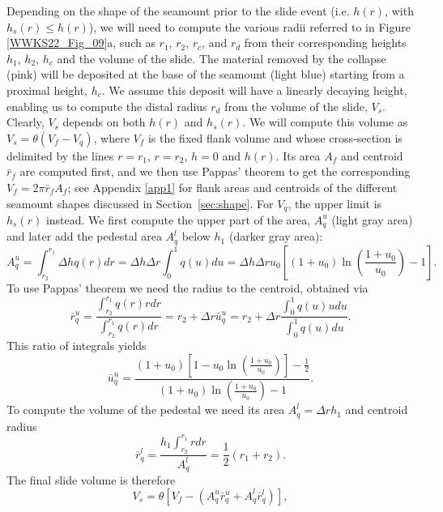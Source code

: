 Depending on the shape of the seamount prior to the slide event (i.e. $h(r)$, with $h_s(r) \le h(r)$), we will
need to compute the various radii referred to in Figure \ref{WWKS22_Fig_09}a, such as $r_1$, $r_2$, $r_c$, and $r_d$
from their corresponding heights $h_1$, $h_2$, $h_c$ and the volume of the slide. The material removed by the collapse (pink)
will be deposited at the base of the seamount (light blue) starting from a proximal height, $h_c$.  We assume this
deposit will have a linearly decaying height, enabling us to compute the distal radius $r_d$ from the volume of the slide,
$V_s$.  Clearly, $V_s$ depends on both $h(r)$ and $h_s(r)$.  We will compute this volume as $V_s = \theta (V_f - V_q)$, where $V_f$
is the fixed flank volume and whose cross-section is delimited by the lines $r = r_1$, $r = r_2$, $h = 0$ and $h(r)$.  Its area $A_f$ and
centroid $\bar{r}_f$ are computed first, and we then use Pappas' theorem to get the corresponding $V_f = 2\pi\bar{r}_f A_f$;
see Appendix \ref{app1} for flank areas and centroids of the different seamount shapes discussed in
Section~\ref{sec:shape}.  For $V_q$, the upper limit is $h_s(r)$ instead. We first compute the upper part of the area,
$A^u_q$ (light gray area) and later add the pedestal area $A^l_q$ below $h_1$ (darker gray area):
\begin{equation*}
A^u_q = \int_{r_2}^{r_1} \Delta h q(r) dr = \Delta h \Delta r \int_0^1 q(u) du = \Delta h \Delta r u_0 \left [ (1 + u_0) \ln \left (\frac{1 + u_0}{u_0} \right ) - 1 \right ].
\end{equation*}
To use Pappas' theorem we need the radius to the centroid, obtained via
\begin{equation*}
\bar{r}^u_q = \frac{\int_{r_2}^{r_1}q(r)rdr}{\int_{r_2}^{r_1}q(r)dr} = r_2 + \Delta r \bar{u}_q^u = r_2 + \Delta r \frac{\int_0^1q(u)udu}{\int_0^1 q(u)du}.
\end{equation*}
This ratio of integrals yields
\begin{equation*}
\bar{u}^u_q = \frac{(1 + u_0)\left [1 - u_0 \ln \left ( \frac{1+u_0}{u_0} \right ) \right ] - \frac{1}{2}}{(1 + u_0) \ln \left (\frac{1 + u_0}{u_0} \right ) - 1}.
\end{equation*}
To compute the volume of the pedestal we need its area $A^l_q = \Delta r h_1$ and centroid radius
\begin{equation*}
\bar{r}^l_q = \frac{ h_1\int_{r_2}^{r_1} rdr}{A^l_q} = \frac{1}{2} (r_1 + r_2).
\end{equation*}
The final slide volume is therefore
\begin{equation*}
V_s = \theta \left [ V_f - \left (A^u_q \bar{r}^u_q + A^l_q \bar{r}^l_q \right ) \right ],
\end{equation*}
